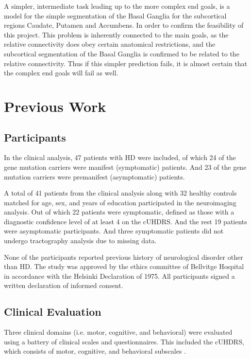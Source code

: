 A simpler, intermediate task leading up to the more complex end goals, is a model for the simple segmentation of the Basal Ganglia for the subcortical regions Caudate, Putamen and Accumbens. In order to confirm the feasibility of this project. This problem is inherently connected to the main goals, as the relative connectivity does obey certain anatomical restrictions, and the subcortical segmentation of the Basal Ganglia is confirmed to be related to the relative connectivity. Thus if this simpler prediction fails, it is almost certain that the complex end goals will fail as well.

\section{Previous Work}

\subsection{Participants}

In the clinical analysis, 47 patients with \ac{HD} were included, of which 24 of the gene mutation carriers were manifest (symptomatic) patients. And 23 of the gene mutation carriers were premanifest (asymptomatic) patients.\par
A total of 41 patients from the clinical analysis along with 32 healthy controls matched for age, sex, and years of education participated in the neuroimaging analysis. Out of which 22 patients were symptomatic, defined as those with a diagnostic confidence level of at least 4 on the \ac{cUHDRS}. And the rest 19 patients were asymptomatic participants. And three symptomatic patients did not undergo tractography analysis due to missing data.\par
None of the participants reported previous history of neurological disorder other than \ac{HD}. The study was approved by the ethics committee of Bellvitge Hospital in accordance with the Helsinki Declaration of 1975. All participants signed a written declaration of informed consent.

\subsection{Clinical Evaluation}

Three clinical domains (i.e. motor, cognitive, and behavioral) were evaluated using a battery of clinical scales and questionnaires. This included the \ac{cUHDRS}, which consists of motor, cognitive, and behavioral subscales \cite{uhdrs}.

